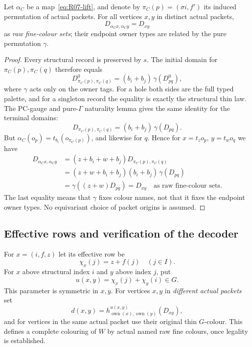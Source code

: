 \begin{lemma}
\label{lem:R07-domain-covariance}
Let $\alpha_C$ be a map~\eqref{eq:R07-lift}, and denote by
$\pi_C(p)=(\sigma i,f')$ its induced permutation of actual
packets.  For all vertices $x,y$ in distinct actual packets,
\begin{equation}\label{eq:R07-raw-domain-invariance}
  D_{\alpha_Cx,\alpha_Cy}=D_{xy}
\end{equation}
as \emph{raw fine-colour sets}; their endpoint owner types
are related by the pure permutation $\gamma$.
\end{lemma}
\begin{proof}
Every structural record is preserved by $s$.
The initial domain for $\pi_C(p),\pi_C(q)$ therefore equals
\[
 D^0_{\pi_C(p),\pi_C(q)}
 =(b_i+b_j)\,\gamma(D^0_{pq}),
\]
where $\gamma$ acts only on the owner tags.  For a hole both
sides are the full typed palette, and for a singleton record
the equality is exactly the structural thin law.
The PC-gauge and pure-$\Gamma$ naturality lemma gives the
same identity for the terminal domains:
\[
 D_{\pi_C(p),\pi_C(q)}=(b_i+b_j)\,\gamma(D_{pq}).
\]
But $\alpha_C(o_p)=t_{b_i}(o_{\pi_C(p)})$, and likewise
for $q$.  Hence for $x=t_zo_p$, $y=t_wo_q$ we have
\begin{align*}
 D_{\alpha_Cx,\alpha_Cy}
  &=(z+b_i+w+b_j)D_{\pi_C(p),\pi_C(q)}\\
  &=(z+w+b_i+b_j)(b_i+b_j)\,\gamma(D_{pq})\\
  &=\gamma((z+w)D_{pq})=D_{xy}
 \quad\text{as raw fine-colour sets}.
\end{align*}
The last equality means that $\gamma$ fixes colour names,
not that it fixes the endpoint owner types.  No equivariant
choice of packet origins is assumed.
\end{proof}

\subsection{Effective rows and verification of the decoder}
\label{subsec:R07-decoder}

For $x=(i,f,z)$ let its effective row be
\begin{equation}\label{eq:R07-effective}
 \chi_x(j)=z+f(j)\quad(j\in I).
\end{equation}
For $x$ above structural index $i$ and $y$ above index $j$,
put
\begin{equation}\label{eq:R07-reading-parameter}
 u(x,y)=\chi_x(j)+\chi_y(i)\in G.
\end{equation}
This parameter is symmetric in $x,y$.
For vertices $x,y$ in \emph{different actual packets} set
\begin{equation}\label{eq:R07-decoding}
  d(x,y)=
 h^{u(x,y)}_{\operatorname{own}(x),\operatorname{own}(y)}(D_{xy}),
\end{equation}
and for vertices in the same actual packet use their original
thin $G$-colour.  This defines a complete colouring of $W$ by
actual named raw fine colours, once legality is established.

